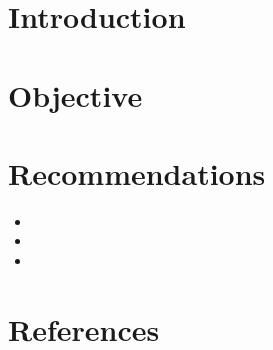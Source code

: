 \documentclass[12pt,english]{scrartcl}
\newcounter{Rnnr}
\renewcommand{\theRnnr}{\alph{Rnnr}}%
\newcommand{\Anm}[1]{%
  \refstepcounter{Rnnr}%
  \textcolor{red}{\textsuperscript{\textit{\theRnnr}}}%
  \makenote[randnot]{%
    \textsuperscript{\theRnnr}#1\xspace}} %
\begin{document}
\begin{addmargin}[0pt]{1cm}
  \section*{Introduction}
  \blindtext

  \section*{Objective}
  \blindtext





  \section*{Recommendations}
  \begin{itemize}[label={}]
    \item {}
    \item {}
    \item {}
  \end{itemize}

  \section*{References}
  \blindtext
\end{addmargin}
\end{document}
